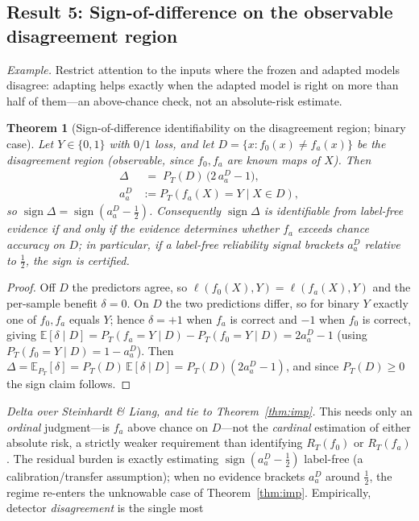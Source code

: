 \documentclass[conference]{IEEEtran}
\theoremstyle{plain}
\newtheorem{theorem}{Theorem}
\theoremstyle{definition}
\newcommand{\E}{\mathbb{E}}
\newcommand{\sign}{\operatorname{sign}}
\begin{document}
\subsection{Result 5: Sign-of-difference on the observable disagreement region}\label{sec:disagree}
\noindent\emph{Example.} Restrict attention to the inputs where the frozen and adapted models
disagree: adapting helps exactly when the adapted model is right on more than half of them---an
above-chance check, not an absolute-risk estimate.
\begin{theorem}[Sign-of-difference identifiability on the disagreement region; binary case]\label{thm:disagree}
Let $Y\in\{0,1\}$ with $0/1$ loss, and let $D=\{x: f_0(x)\neq f_a(x)\}$ be the
\emph{disagreement region} (observable, since $f_0,f_a$ are known maps of $X$). Then
\[
\begin{aligned}
\Delta &\;=\; P_T(D)\,\bigl(2\,a_a^D-1\bigr),\\
a_a^D &:=P_T\!\left(f_a(X)=Y \mid X\in D\right),
\end{aligned}
\]
so $\sign\Delta=\sign\!\left(a_a^D-\tfrac12\right)$. Consequently $\sign\Delta$ is
identifiable from label-free evidence \emph{if and only if} the evidence determines
whether $f_a$ exceeds chance accuracy on $D$; in particular, if a label-free
reliability signal brackets $a_a^D$ relative to $\tfrac12$, the sign is certified.
\end{theorem}
\begin{proof}
Off $D$ the predictors agree, so $\ell(f_0(X),Y)=\ell(f_a(X),Y)$ and the per-sample
benefit $\delta=0$. On $D$ the two predictions differ, so for binary $Y$ exactly one
of $f_0,f_a$ equals $Y$; hence $\delta=+1$ when $f_a$ is correct and $-1$ when $f_0$
is correct, giving $\E[\delta\mid D]=P_T(f_a{=}Y\mid D)-P_T(f_0{=}Y\mid D)=2a_a^D-1$
(using $P_T(f_0{=}Y\mid D)=1-a_a^D$). Then
$\Delta=\E_{P_T}[\delta]=P_T(D)\,\E[\delta\mid D]=P_T(D)(2a_a^D-1)$, and since
$P_T(D)\ge0$ the sign claim follows. \qedhere
\end{proof}
\noindent\emph{Delta over Steinhardt \& Liang, and tie to Theorem~\ref{thm:imp}.}
This needs only an \emph{ordinal} judgment---is $f_a$ above chance on $D$---not the
\emph{cardinal} estimation of either absolute risk, a strictly weaker requirement than
identifying $R_T(f_0)$ or $R_T(f_a)$. The residual burden is exactly estimating
$\sign(a_a^D-\tfrac12)$ label-free (a calibration/transfer assumption); when no
evidence brackets $a_a^D$ around $\tfrac12$, the regime re-enters the unknowable case
of Theorem~\ref{thm:imp}. Empirically, detector \emph{disagreement} is the single most
\end{document}
